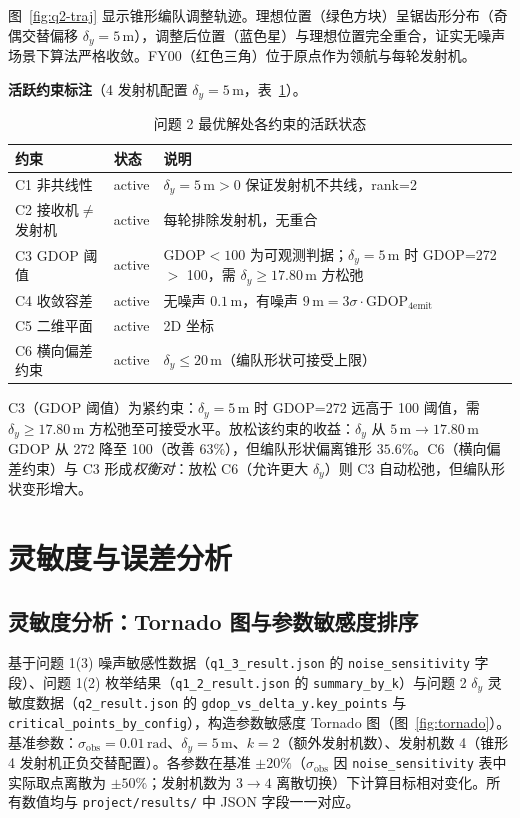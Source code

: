 \documentclass[12pt,a4paper]{ctexart}
\newcommand{\unit}[1]{\ensuremath{\,\mathrm{#1}}}
\newcommand{\figref}[1]{图~\ref{#1}}
\newcommand{\tabref}[1]{表~\ref{#1}}
\begin{document}
\figref{fig:q2-traj} 显示锥形编队调整轨迹。理想位置（绿色方块）呈锯齿形分布（奇偶交替偏移 $\delta_y=5\unit{m}$），调整后位置（蓝色星）与理想位置完全重合，证实无噪声场景下算法严格收敛。FY00（红色三角）位于原点作为领航与每轮发射机。

\textbf{活跃约束标注}（4 发射机配置 $\delta_y=5\unit{m}$，\tabref{tab:q2-active}）。

\begin{table}[H]
\centering
\caption{问题 2 最优解处各约束的活跃状态}
\label{tab:q2-active}
\begin{tabular}{lll}
\toprule
约束 & 状态 & 说明 \\
\midrule
C1 非共线性 & active & $\delta_y=5\unit{m}>0$ 保证发射机不共线，rank=2 \\
C2 接收机$\neq$发射机 & active & 每轮排除发射机，无重合 \\
C3 GDOP 阈值 & active & GDOP$<100$ 为可观测判据；$\delta_y=5\unit{m}$ 时 GDOP=272 $>$ 100，需 $\delta_y\geq 17.80\unit{m}$ 方松弛 \\
C4 收敛容差 & active & 无噪声 $0.1\unit{m}$，有噪声 $9\unit{m}=3\sigma\cdot\text{GDOP}_{4\text{emit}}$ \\
C5 二维平面 & active & 2D 坐标 \\
C6 横向偏差约束 & active & $\delta_y\leq 20\unit{m}$（编队形状可接受上限） \\
\bottomrule
\end{tabular}
\end{table}

C3（GDOP 阈值）为紧约束：$\delta_y=5\unit{m}$ 时 GDOP=272 远高于 100 阈值，需 $\delta_y\geq 17.80\unit{m}$ 方松弛至可接受水平。放松该约束的收益：$\delta_y$ 从 $5\unit{m}\to 17.80\unit{m}$ GDOP 从 272 降至 100（改善 63\%），但编队形状偏离锥形 $35.6\%$。C6（横向偏差约束）与 C3 形成\emph{权衡对}：放松 C6（允许更大 $\delta_y$）则 C3 自动松弛，但编队形状变形增大。

\section{灵敏度与误差分析}

\subsection{灵敏度分析：Tornado 图与参数敏感度排序}

基于问题 1(3) 噪声敏感性数据（\texttt{q1\_3\_result.json} 的 \texttt{noise\_sensitivity} 字段）、问题 1(2) 枚举结果（\texttt{q1\_2\_result.json} 的 \texttt{summary\_by\_k}）与问题 2 $\delta_y$ 灵敏度数据（\texttt{q2\_result.json} 的 \texttt{gdop\_vs\_delta\_y.key\_points} 与 \texttt{critical\_points\_by\_config}），构造参数敏感度 Tornado 图（\figref{fig:tornado}）。基准参数：$\sigma_{\text{obs}}=0.01\unit{rad}$、$\delta_y=5\unit{m}$、$k=2$（额外发射机数）、发射机数 4（锥形 4 发射机正负交替配置）。各参数在基准 $\pm 20\%$（$\sigma_{\text{obs}}$ 因 \texttt{noise\_sensitivity} 表中实际取点离散为 $\pm 50\%$；发射机数为 $3\to 4$ 离散切换）下计算目标相对变化。所有数值均与 \texttt{project/results/} 中 JSON 字段一一对应。
\end{document}
